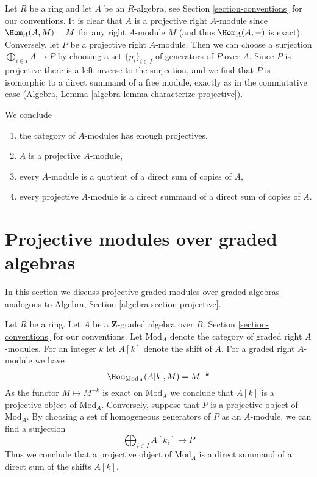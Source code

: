 \medskip\noindent
Let $R$ be a ring and let $A$ be an $R$-algebra, see
Section \ref{section-conventions} for our conventions.
It is clear that $A$ is a projective right $A$-module since
$\Hom_A(A, M) = M$ for any right $A$-module $M$ (and thus $\Hom_A(A, -)$
is exact). Conversely, let $P$ be a projective right $A$-module. Then
we can choose a surjection
$\bigoplus_{i \in I} A \to P$ by choosing a set $\{p_i\}_{i \in I}$
of generators of $P$ over $A$. Since $P$ is projective there is a
left inverse to the surjection, and we find that $P$ is isomorphic
to a direct summand of a free module, exactly as in the commutative case
(Algebra, Lemma \ref{algebra-lemma-characterize-projective}).

\medskip\noindent
We conclude
\begin{enumerate}
\item the category of $A$-modules has enough projectives,
\item $A$ is a projective $A$-module,
\item every $A$-module is a quotient of a direct sum of copies of $A$,
\item every projective $A$-module is a direct summand of a direct
sum of copies of $A$.
\end{enumerate}



\section{Projective modules over graded algebras}
\label{section-projectives-over-graded-algebras}

\noindent
In this section we discuss projective graded modules over graded algebras
analogous to Algebra, Section \ref{algebra-section-projective}.

\medskip\noindent
Let $R$ be a ring. Let $A$ be a $\mathbf{Z}$-graded algebra over $R$.
Section \ref{section-conventions} for our conventions.
Let $\text{Mod}_A$ denote the category of graded right $A$-modules.
For an integer $k$ let $A[k]$ denote the shift of $A$.
For a graded right $A$-module we have
$$
\Hom_{\text{Mod}_A}(A[k], M) = M^{-k}
$$
As the functor $M \mapsto M^{-k}$ is exact on $\text{Mod}_A$ we
conclude that $A[k]$ is a projective object of $\text{Mod}_A$.
Conversely, suppose that $P$ is a projective object of $\text{Mod}_A$.
By choosing a set of homogeneous generators of $P$ as an $A$-module,
we can find a surjection
$$
\bigoplus\nolimits_{i \in I} A[k_i] \longrightarrow P
$$
Thus we conclude that a projective object of $\text{Mod}_A$ is
a direct summand of a direct sum of the shifts $A[k]$.

